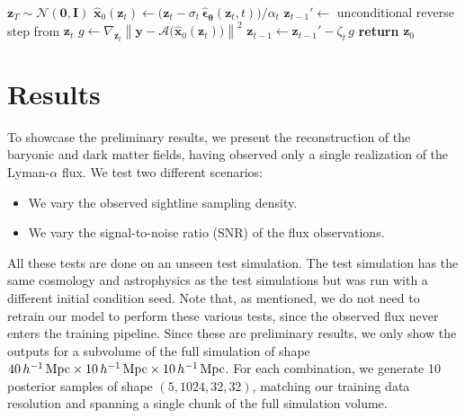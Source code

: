 \begin{algorithm}[h!]
\caption{Diffusion posterior sampling for joint five-field reconstruction}
\label{alg:dps}
\begin{algorithmic}[1]
\State $\bm{z}_T \sim \mathcal{N}(\mathbf{0},\mathbf{I})$
    \State $\hat{\bm{x}}_0(\bm{z}_t) \gets \big(\bm{z}_t - \sigma_t\,\hat{\bm\epsilon}_{\bm\theta}(\bm{z}_t,t)\big)/\alpha_t$ 
    \State $\bm{z}_{t-1}' \gets$ unconditional reverse step from $\bm{z}_t$ 
    \State $g \gets \nabla_{\bm{z}_t}\left\lVert\bm{y}-\mathcal{A}\big(\hat{\bm{x}}_0(\bm{z}_t)\big)\right\rVert^2$ 
    \State $\bm{z}_{t-1} \gets \bm{z}_{t-1}' - \zeta_t\, g$ 
\EndFor
\State \textbf{return} $\bm{z}_0$ 
\end{algorithmic}
\end{algorithm}



\section{Results}
\label{sec:dps_results}
To showcase the preliminary results, we present the reconstruction of the baryonic and dark matter fields, having observed only a single realization of the Lyman-$\alpha$ flux. We test two different scenarios:
\begin{itemize}
    \item We vary the observed sightline sampling density.
    \item We vary the signal-to-noise ratio (SNR) of the flux observations.
\end{itemize}
All these tests are done on an unseen test simulation. The test simulation has the same cosmology and astrophysics as the test simulations but was run with a different initial condition seed.
Note that, as mentioned, we do not need to retrain our model to perform these various tests, since the observed flux never enters the training pipeline. Since these are preliminary results, we only show the outputs for a subvolume of the full simulation of shape $40\,h^{-1}\,\mathrm{Mpc}\times10\,h^{-1}\,\mathrm{Mpc}\times10\,h^{-1}\,\mathrm{Mpc}$. For each combination, we generate 10 posterior samples of shape $(5,1024,32,32)$, matching our training data resolution and spanning a single chunk of the full simulation volume.


